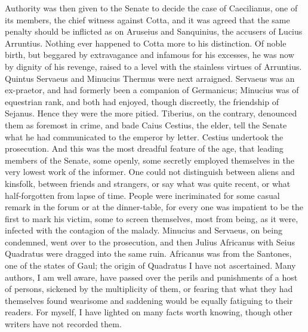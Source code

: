 Authority was then given to the Senate to decide the case of Caecilianus, one of its members, the chief witness against Cotta, and it was agreed that the same penalty should be inflicted as on Aruseius and Sanquinius, the accusers of Lucius Arruntius. Nothing ever happened to Cotta more to his distinction. Of noble birth, but beggared by extravagance and infamous for his excesses, he was now by dignity of his revenge, raised to a level with the stainless virtues of Arruntius. Quintus Servaeus and Minucius Thermus were next arraigned. Servaeus was an ex-praetor, and had formerly been a companion of Germanicus; Minucius was of equestrian rank, and both had enjoyed, though discreetly, the friendship of Sejanus. Hence they were the more pitied. Tiberius, on the contrary, denounced them as foremost in crime, and bade Caius Cestius, the elder, tell the Senate what he had communicated to the emperor by letter. Cestius undertook the prosecution. And this was the most dreadful feature of the age, that leading members of the Senate, some openly, some secretly employed themselves in the very lowest work of the informer. One could not distinguish between aliens and kinsfolk, between friends and strangers, or say what was quite recent, or what half-forgotten from lapse of time. People were incriminated for some casual remark in the forum or at the dinner-table, for every one was impatient to be the first to mark his victim, some to screen themselves, most from being, as it were, infected with the contagion of the malady. Minucius and Servaeus, on being condemned, went over to the prosecution, and then Julius Africanus with Seius Quadratus were dragged into the same ruin. Africanus was from the Santones, one of the states of Gaul; the origin of Quadratus I have not ascertained. Many authors, I am well aware, have passed over the perils and punishments of a host of persons, sickened by the multiplicity of them, or fearing that what they had themselves found wearisome and saddening would be equally fatiguing to their readers. For myself, I have lighted on many facts worth knowing, though other writers have not recorded them.


